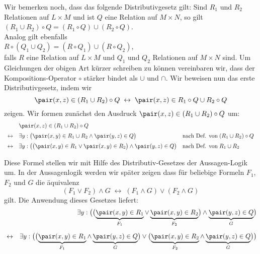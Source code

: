 \noindent
Wir bemerken noch, dass das folgende Distributivgesetz gilt: Sind $R_1$ und $R_2$
Relationen auf $L \times M$ und ist $Q$ eine Relation auf $M \times N$, so gilt \\[0.2cm]
\hspace*{1.3cm}  $(R_1 \cup R_2) \circ Q = (R_1 \circ Q) \cup (R_2 \circ Q)$. \\[0.2cm]
Analog gilt ebenfalls \\[0.2cm]
\hspace*{1.3cm}  $R \circ (Q_1 \cup Q_2) = (R \circ Q_1) \cup (R \circ Q_2)$, \\[0.2cm]
falls $R$ eine Relation auf $L \times M$ und $Q_1$ und $Q_2$ Relationen auf $M \times N$
sind.  Um Gleichungen der obigen Art k\"{u}rzer schreiben zu k\"{o}nnen vereinbaren wir, dass der
Kompositions-Operator $\circ$ st\"{a}rker bindet als $\cup$ und $\cap$.  Wir beweisen nun das
erste Distributivgesetz, indem wir 
\begin{equation}
  \label{eq:dis0}
\pair(x,z) \in (R_1 \cup R_2) \circ Q \;\leftrightarrow\; \pair(x,z) \in R_1 \circ Q \cup R_2 \circ Q   
\end{equation}
zeigen.  Wir formen zun\"{a}chst den Ausdruck $\pair(x,z) \in (R_1 \cup R_2) \circ Q$ um:
\[
\begin{array}{cll}
                  & \pair(x,z) \in (R_1 \cup R_2) \circ Q  \\[0.2cm]
  \leftrightarrow & \exists y: \bigl(\pair(x,y) \in R_1 \cup R_2 \wedge \pair(y,z) \in Q\bigr) 
                  & \mbox{nach Def. von}\; (R_1 \cup R_2) \circ Q \\[0.2cm]
  \leftrightarrow & \exists y: \bigl(\bigl(\pair(x,y) \in R_1 \vee \pair(x,y) \in R_2\bigr) \wedge \pair(y,z) \in Q\bigr) 
                  & \mbox{nach Def. von}\; R_1 \cup R_2 \\[0.2cm]
\end{array}
\]
Diese Formel stellen wir mit Hilfe des Distributiv-Gesetzes der Aussagen-Logik um.
In der Aussagenlogik werden wir sp\"{a}ter zeigen dass f\"{u}r beliebige Formeln
$F_1$, $F_2$ und $G$ die \"{a}quivalenz 
\[ (F_1 \vee F_2) \wedge G \;\leftrightarrow\; (F_1 \wedge G) \vee (F_2 \wedge G) \]
gilt.  Die Anwendung dieses Gesetzes liefert:
\begin{eqnarray}
  \nonumber
  & & \exists y: \bigl(\bigl(\underbrace{\pair(x,y) \in R_1}_{F_1} \vee \underbrace{\pair(x,y) \in R_2}_{F_2}\bigr) \wedge \underbrace{\pair(y,z) \in Q}_G\bigr) 
\\[0.2cm] 
  \label{eq:dis1}
  & \leftrightarrow &
    \exists y: \bigl(\bigl(\underbrace{\pair(x,y) \in R_1}_{F_1} \wedge \underbrace{\pair(y,z) \in Q}_G \bigr) \vee 
               \bigl(\underbrace{\pair(x,y) \in R_2}_{F_2} \wedge \underbrace{\pair(y,z) \in Q}_G \bigr) \bigr)   
\end{eqnarray}
